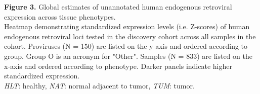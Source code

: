 \textbf{Figure 3.} Global estimates of unannotated human endogenous retroviral expression across tissue phenotypes. \\
Heatmap demonstrating standardized expression levels (i.e. Z-scores) of human endogenous retroviral loci tested in the discovery cohort across all samples in the cohort.
Proviruses (N = 150) are listed on the y-axis and ordered according to group.
Group O is an acronym for "Other".
Samples (N = 833) are listed on the x-axis and ordered according to phenotype.
Darker panels indicate higher standardized expression. \\
\emph{HLT}: healthy, \emph{NAT}: normal adjacent to tumor, \emph{TUM}: tumor.
